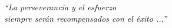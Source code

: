 \documentclass[a4paper, 11pt, oneside]{Thesis}  %
\begin{document}
%
%
%
% 
% 
% 
% 
% 
% 
% 
% 

\pagestyle{empty}  %

\null\vfill
\textit{``La perseverancia y el esfuerzo \\ siempre ser\'{a}n recompensados con el \'{e}xito ...''}
%
\end{document}
